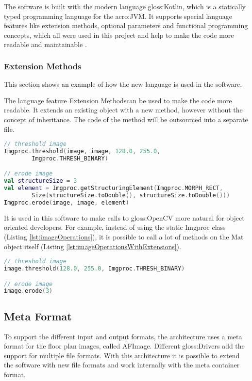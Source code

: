 The software is built with the modern language \gls{gloss:Kotlin}, which is a statically typed programming language for the \acrfull{acro:JVM}. It supports special language features like extension methods, optional parameters and functional programming concepts, which all were used in this project and help to make the code more readable and maintainable \citep{kotlin}.

\subsubsection{Extension Methods}
This section shows an example of how the new language is used in the software.

The language feature \flqq Extension Methods\frqq  can be used to make the code more readable. It extends an existing object with a new method, however without the concept of inheritance. The code of the method will be outsourced into a separate file.

\begin{lstlisting}[caption={Erode image without extension methods},label={lst:imageOperations},language=Kotlin]
// threshold image
Imgproc.threshold(image, image, 128.0, 255.0, 
		Imgproc.THRESH_BINARY)

// erode image
val structureSize = 3
val element = Imgproc.getStructuringElement(Imgproc.MORPH_RECT, 
        Size(structureSize.toDouble(), structureSize.toDouble()))
Imgproc.erode(image, image, element)
\end{lstlisting}

It is used in this software to make calls to \gls{gloss:OpenCV} more natural for object oriented developers. For example, instead of using the static Imgproc class (Listing \ref{lst:imageOperations}), it is possible to call a lot of methods on the Mat object itself (Listing \ref{lst:imageOperationsWithExtensions}).

\begin{lstlisting}[caption={Erode image with extension methods},label={lst:imageOperationsWithExtensions},language=Kotlin]
// threshold image
image.threshold(128.0, 255.0, Imgproc.THRESH_BINARY)

// erode image
image.erode(3)
\end{lstlisting}

\pagebreak

\subsection{Meta Format}
To support the different input and output formats, the architecture uses a meta format for the
floor plan images, called AFImage. Different \gls{gloss:Drivers} add the support for multiple file formats. With this architecture it is possible to extend the software with new file formats and work internally with the meta container format.

